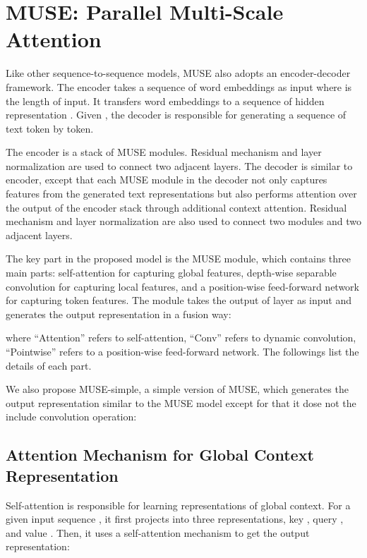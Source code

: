 \documentclass{article} \usepackage{iclr2020_conference,times}
\begin{document}
\section{MUSE: Parallel Multi-Scale Attention}






Like other sequence-to-sequence models, MUSE also adopts an encoder-decoder framework. The encoder takes a sequence of word embeddings  as input where  is the length of input. It transfers word embeddings to a sequence of hidden representation . Given , the decoder is responsible for generating a sequence of text  token by token. 

The encoder is a stack of   MUSE modules. Residual mechanism and layer normalization are used to connect two adjacent layers.  
The decoder is similar to encoder, except that each MUSE module in the decoder not only captures features from the generated text representations  but also performs attention over the output of the encoder stack through additional context attention. Residual mechanism and layer normalization are also used to connect two modules and two adjacent layers. 



The key part in the proposed model is the MUSE module, which contains three main parts: self-attention for capturing global features, depth-wise separable convolution for capturing local features, and a position-wise feed-forward network for capturing token features. The module takes the output of  layer as input and generates the output representation in a fusion way:

where  ``Attention'' refers to self-attention, ``Conv'' refers to dynamic convolution, ``Pointwise'' refers to a position-wise feed-forward network. The followings list the details of each part. 

We also propose MUSE-simple, a simple version of MUSE, which generates the output representation similar to the MUSE model except for that it dose not the include convolution operation:


\subsection{Attention Mechanism for Global Context Representation}


Self-attention is responsible for  learning representations of global context.
 For a given input sequence , it first projects  into three representations, key , query , and value . Then, it uses a self-attention mechanism to get the output representation:
\end{document}
